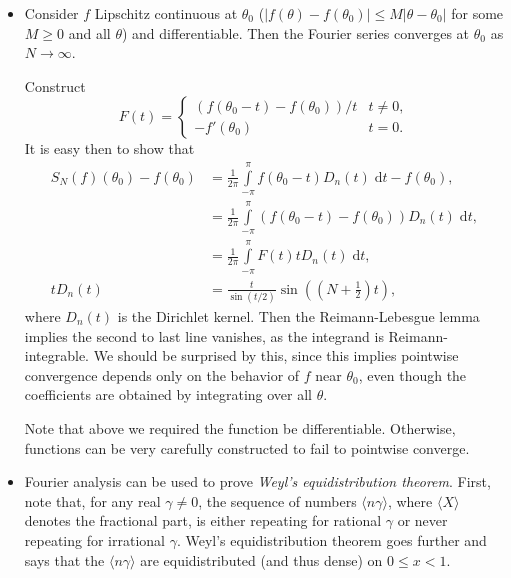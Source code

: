 \documentclass[11pt,
        usenames, %
        dvipsnames %
    ]{report}
\newcommand*{\abs}[1]{\left|#1\right|}
\newcommand*{\ev}[1]{\langle#1\rangle}
\newcommand*{\p}[1]{\left(#1\right)}
\begin{document}
\begin{itemize}
    \item Consider $f$ Lipschitz continuous at $\theta_0$ ($\abs{f(\theta) -
        f(\theta_0)} \leq M\abs{\theta - \theta_0}$ for some $M \geq 0$ and all
        $\theta$) and differentiable. Then the Fourier series converges at
        $\theta_0$ as $N \to \infty$.

        Construct
        \begin{equation}
            F(t) =
            \begin{cases}
                (f(\theta_0 - t) - f(\theta_0)) / t & t \neq 0,\\
                -f'(\theta_0) & t = 0.
            \end{cases}
        \end{equation}
        It is easy then to show that
        \begin{align}
            S_N(f)(\theta_0) - f(\theta_0) &= \frac{1}{2\pi}
                \int\limits_{-\pi}^\pi f(\theta_0 - t) D_n(t)\;\mathrm{d}t
                - f(\theta_0),\\
            &= \frac{1}{2\pi}
                \int\limits_{-\pi}^\pi \p{f(\theta_0 - t)
                - f(\theta_0)} D_n(t)\;\mathrm{d}t,\\
            &= \frac{1}{2\pi}\int\limits_{-\pi}^\pi
                F(t)tD_n(t)\;\mathrm{d}t,\\
            tD_n(t) &= \frac{t}{\sin(t/2)}\sin\p{\p{N + \frac{1}{2}}t},
        \end{align}
        where $D_n(t)$ is the Dirichlet kernel. Then the Reimann-Lebesgue lemma
        implies the second to last line vanishes, as the integrand is
        Reimann-integrable. We should be surprised by this, since this implies
        pointwise convergence depends only on the behavior of $f$ near
        $\theta_0$, even though the coefficients are obtained by integrating
        over all $\theta$.

        Note that above we required the function be differentiable. Otherwise,
        functions can be very carefully constructed to fail to pointwise
        converge.

    \item Fourier analysis can be used to prove \emph{Weyl's equidistribution
        theorem}. First, note that, for any real $\gamma \neq 0$, the sequence
        of numbers $\ev{n\gamma}$, where $\ev{X}$ denotes the fractional part,
        is either repeating for rational $\gamma$ or never repeating for
        irrational $\gamma$. Weyl's equidistribution theorem goes further and
        says that the $\ev{n\gamma}$ are equidistributed (and thus dense) on $0
        \leq x < 1$.


\end{itemize}
\end{document}
